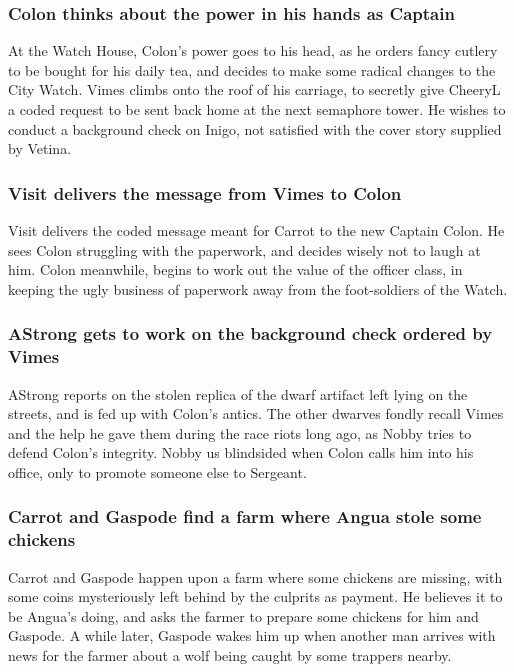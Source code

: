 \subsubsection{\Gls{Colon} thinks about the power in his hands as Captain}
At the Watch House, \Gls{Colon}'s power goes to his head, as he orders fancy cutlery to be bought
for his daily tea, and decides to make some radical changes to the City Watch. \Gls{Vimes} climbs
onto the roof of his carriage, to secretly give \Gls{CheeryL} a coded request to be sent back
home at the next semaphore tower. He wishes to conduct a background check on \Gls{Inigo}, not
satisfied with the cover story supplied by \Gls{Vetina}.

\subsubsection{\Gls{Visit} delivers the message from \Gls{Vimes} to \Gls{Colon}}
\Gls{Visit} delivers the coded message meant for \Gls{Carrot} to the new Captain \Gls{Colon}.
He sees \Gls{Colon} struggling with the paperwork, and decides wisely not to laugh at him.
\Gls{Colon} meanwhile, begins to work out the value of the officer class, in keeping the ugly
business of paperwork away from the foot-soldiers of the Watch.

\subsubsection{\Gls{AStrong} gets to work on the background check ordered by \Gls{Vimes}}
\Gls{AStrong} reports on the stolen replica of the dwarf artifact left lying on the streets, and
is fed up with \Gls{Colon}'s antics. The other dwarves fondly recall \Gls{Vimes} and the help he
gave them during the race riots long ago, as \Gls{Nobby} tries to defend \Gls{Colon}'s integrity.
\Gls{Nobby} us blindsided when \Gls{Colon} calls him into his office, only to promote someone else
to Sergeant.

\subsubsection{\Gls{Carrot} and \Gls{Gaspode} find a farm where \Gls{Angua} stole some chickens}
\Gls{Carrot} and \Gls{Gaspode} happen upon a farm where some chickens are missing, with some coins
mysteriously left behind by the culprits as payment. He believes it to be \Gls{Angua}'s doing, and
asks the farmer to prepare some chickens for him and \Gls{Gaspode}. A while later, \Gls{Gaspode}
wakes him up when another man arrives with news for the farmer about a wolf being caught by some
trappers nearby.

